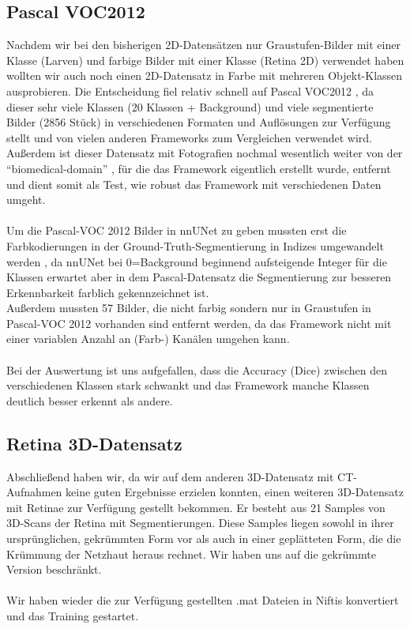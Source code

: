\subsection{Pascal VOC2012}
Nachdem wir bei den bisherigen 2D-Datensätzen nur Graustufen-Bilder mit einer Klasse (Larven) und farbige Bilder mit einer Klasse (Retina 2D) verwendet haben wollten wir auch noch einen 2D-Datensatz in Farbe mit mehreren Objekt-Klassen ausprobieren. Die Entscheidung fiel relativ schnell auf Pascal VOC2012 \cite{PascalVOCDatensatz}, da dieser sehr viele Klassen (20 Klassen + Background) und viele segmentierte Bilder (2856 Stück) in verschiedenen Formaten und Auflösungen zur Verfügung stellt und von vielen anderen Frameworks zum Vergleichen verwendet wird. Außerdem ist dieser Datensatz mit Fotografien nochmal wesentlich weiter von der \enquote{biomedical-domain} \cite{nnunetGithub2D-Daten}, für die das Framework eigentlich erstellt wurde, entfernt und dient somit als Test, wie robust das Framework mit verschiedenen Daten umgeht.\\\\
Um die Pascal-VOC 2012 Bilder in nnUNet zu geben mussten erst die Farbkodierungen in der Ground-Truth-Segmentierung in Indizes umgewandelt werden \cite{autoMLGithub}, da nnUNet bei 0=Background beginnend aufsteigende Integer für die Klassen erwartet aber in dem Pascal-Datensatz \cite{PascalVOCDatensatz} die Segmentierung zur besseren Erkennbarkeit farblich gekennzeichnet ist.\\
Außerdem mussten 57 Bilder, die nicht farbig sondern nur in Graustufen in Pascal-VOC 2012 \cite{PascalVOCDatensatz} vorhanden sind entfernt werden, da das Framework nicht mit einer variablen Anzahl an (Farb-) Kanälen umgehen kann.\\\\

Bei der Auswertung ist uns aufgefallen, dass die Accuracy (Dice) zwischen den verschiedenen Klassen stark schwankt und das Framework manche Klassen deutlich besser erkennt als andere. 

\subsection{Retina 3D-Datensatz}
Abschließend haben wir, da wir auf dem anderen 3D-Datensatz mit CT-Aufnahmen  keine guten Ergebnisse erzielen konnten, einen weiteren 3D-Datensatz mit Retinae zur Verfügung gestellt bekommen. Er besteht aus 21 Samples von 3D-Scans der Retina mit Segmentierungen. Diese Samples liegen sowohl in ihrer ursprünglichen, gekrümmten Form vor als auch in einer geplätteten Form, die die Krümmung der Netzhaut heraus rechnet. Wir haben uns auf die gekrümmte Version beschränkt.\\\\
Wir haben wieder die zur Verfügung gestellten .mat Dateien in Niftis konvertiert \cite{autoMLGithub} und das Training gestartet.





